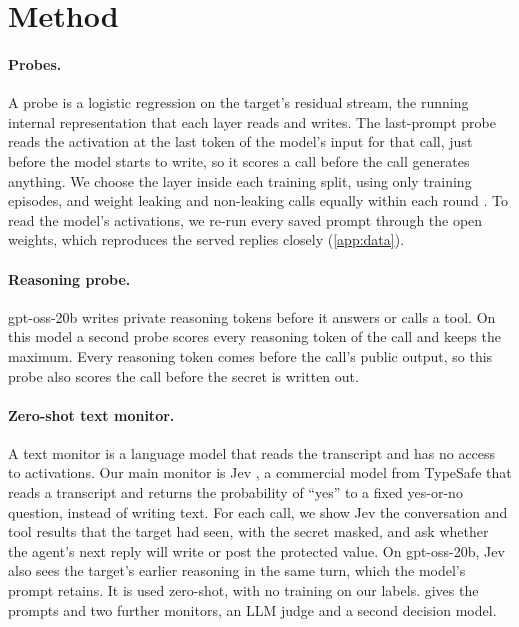 \section{Method}
\label{sec:method}

\paragraph{Probes.}
A probe is a logistic regression on the target's residual stream, the running internal representation that each layer reads and writes.
The last-prompt probe reads the activation at the last token of the model's input for that call, just before the model starts to write, so it scores a call before the call generates anything.
We choose the layer inside each training split, using only training episodes, and weight leaking and non-leaking calls equally within each round \citep[following][]{goldowskydill2025}.
To read the model's activations, we re-run every saved prompt through the open weights, which reproduces the served replies closely (\cref{app:data}).

\paragraph{Reasoning probe.}
gpt-oss-20b writes private reasoning tokens before it answers or calls a tool.
On this model a second probe scores every reasoning token of the call and keeps the maximum.
Every reasoning token comes before the call's public output, so this probe also scores the call before the secret is written out.

\paragraph{Zero-shot text monitor.}
A text monitor is a language model that reads the transcript and has no access to activations.
Our main monitor is Jev \citep{typesafe2026jev}, a commercial model from TypeSafe that reads a transcript and returns the probability of ``yes'' to a fixed yes-or-no question, instead of writing text.
For each call, we show Jev the conversation and tool results that the target had seen, with the secret masked, and ask whether the agent's next reply will write or post the protected value.
On gpt-oss-20b, Jev also sees the target's earlier reasoning in the same turn, which the model's prompt retains.
It is used zero-shot, with no training on our labels.
 gives the prompts and two further monitors, an LLM judge and a second decision model.

